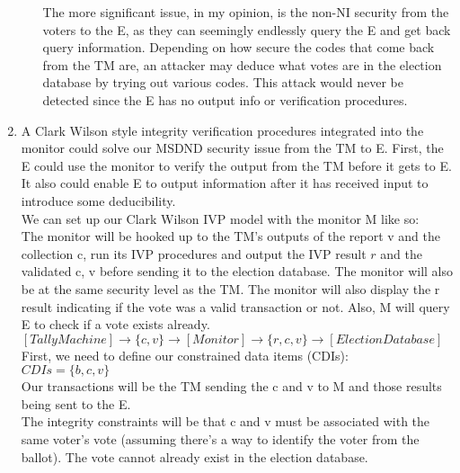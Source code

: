 \documentclass[journal,onecolumn]{IEEEtran}
\begin{document}
\begin{enumerate}
\begin{enumerate}
      The more significant issue, in my opinion, is the non-NI security from the voters to the E, as they can seemingly endlessly query the E and get back query information. Depending on how secure the codes that come back from the TM are, an attacker may deduce what votes are in the election database by trying out various codes. This attack would never be detected since the E has no output info or verification procedures. 

    \end{enumerate}
    \item A Clark Wilson style integrity verification procedures integrated into the monitor could solve our MSDND security issue from the TM to E. First, the E could use the monitor to verify the output from the TM before it gets to E. It also could enable E to output information after it has received input to introduce some deducibility. \\
    
    We can set up our Clark Wilson IVP model with the monitor M like so: \\

    The monitor will be hooked up to the TM's outputs of the report v and the collection c, run its IVP procedures and output the IVP result $r$ and the validated c, v before sending it to the election database. The monitor will also be at the same security level as the TM. The monitor will also display the r result indicating if the vote was a valid transaction or not. Also, M will query E to check if a vote exists already. \\

    $[Tally Machine] \rightarrow \{c, v\} \rightarrow [Monitor] \rightarrow \{r, c, v\} \rightarrow [Election Database]$ \\

    First, we need to define our constrained data items (CDIs): \\

    $CDIs = \{b, c, v\}$\\

    Our transactions will be the TM sending the c and v to M and those results being sent to the E. \\

    The integrity constraints will be that c and v must be associated with the same voter's vote (assuming there's a way to identify the voter from the ballot). The vote cannot already exist in the election database. \\


\end{enumerate}
\end{document}
